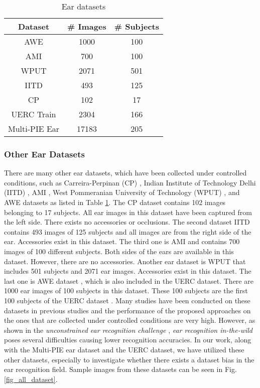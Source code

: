 \documentclass[11pt,journal,compsoc]{IEEEtran}
\begin{document}
\begin{table}[!t]
\renewcommand{\arraystretch}{1.3}
\caption{Ear datasets}
\label{tab_dataset}
\centering
\begin{tabular}{|c|c|c|}
\hline
Dataset  & \# Images & \# Subjects\\
\hline
AWE \cite{Emersic_2017_a} & 1000 & 100 \\
\hline
AMI \cite{Gonzalez_2008} & 700 & 100 \\
\hline
WPUT \cite{Frejlichowski_2010} & 2071 & 501 \\
\hline
IITD \cite{Kumar_2012} & 493 & 125 \\
\hline
CP \cite{Carreira_Perpinan_1995} & 102 & 17 \\
\hline
UERC Train \cite{Emersic_2017_b} & 2304 & 166 \\
\hline
Multi-PIE Ear \cite{Gross_2008_a,Gross_2008_b} & 17183 & 205 \\
\hline
\end{tabular}
\end{table}

\subsubsection{Other Ear Datasets} 
There are many other ear datasets, which have been collected under controlled conditions, such as Carreira-Perpinan (CP) \cite{Carreira_Perpinan_1995}, Indian Institute of Technology Delhi (IITD) \cite{Kumar_2012}, AMI \cite{Gonzalez_2008}, West Pommeranian University of Technology (WPUT) \cite{Frejlichowski_2010}, and AWE \cite{Emersic_2017_a} datasets as listed in Table \ref{tab_dataset}. The CP dataset \cite{Carreira_Perpinan_1995} contains 102 images belonging to 17 subjects. All ear images in this dataset have been captured from the left side. There exists no accessories or occlusions. The second dataset IITD \cite{Kumar_2012} contains 493 images of 125 subjects and all images are from the right side of the ear. Accessories exist in this dataset. The third one is AMI \cite{Gonzalez_2008} and contains 700 images of 100 different subjects. Both sides of the ears are available in this dataset. However, there are no accessories. Another ear dataset is WPUT \cite{Frejlichowski_2010} that includes 501 subjects and 2071 ear images. Accessories exist in this dataset. The last one is AWE dataset \cite{Emersic_2017_a}, which is also included in the UERC dataset. There are 1000 ear images of 100 subjects in this dataset. These 100 subjects are the first 100 subjects of the UERC dataset \cite{Emersic_2017_b,Emersic_2017_c}. Many studies have been conducted on these datasets in previous studies and the performance of the proposed approaches on the ones that are collected under controlled conditions are very high. However, as shown in the \textit{unconstrained ear recognition challenge} \cite{Emersic_2017_b}, \textit{ear recognition in-the-wild} poses several difficulties causing lower recognition accuracies. In our work, along with the Multi-PIE ear dataset and the UERC dataset, we have utilized these other datasets, especially to investigate whether there exists a dataset bias in the ear recognition field. Sample images from these datasets can be seen in Fig. \ref{fig_all_dataset}.
\end{document}
